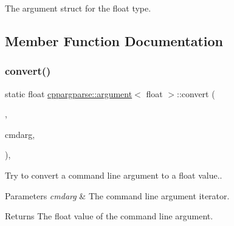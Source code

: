 The argument struct for the float type. 

\subsection{Member Function Documentation}
\mbox{\label{structcppargparse_1_1argument_3_01float_01_4_a9acfaf2335353a8b627831ed5a74b37b}} 
\subsubsection{\texorpdfstring{convert()}{convert()}}
{\footnotesize\ttfamily static float \hyperlink{structcppargparse_1_1argument}{cppargparse\+::argument}$<$ float $>$\+::convert (\begin{DoxyParamCaption}\item[{const types\+::\+Command\+Line\+\_\+t \&}]{,  }\item[{const types\+::\+Command\+Line\+Argument\+\_\+t \&}]{cmdarg,  }\item[{const types\+::\+Command\+Line\+Arguments\+Map\+\_\+t \&}]{ }\end{DoxyParamCaption})\hspace{0.3cm}{\ttfamily [inline]}, {\ttfamily [static]}}



Try to convert a command line argument to a float value.. 


\begin{DoxyParams}{Parameters}
{\em cmdarg} & The command line argument iterator.\\
\hline
\end{DoxyParams}
\begin{DoxyReturn}{Returns}
The float value of the command line argument. 
\end{DoxyReturn}
\mbox{\label{structcppargparse_1_1argument_3_01float_01_4_a425c616f08d003b24e510f826bb65215}} 
